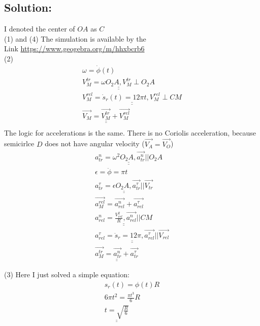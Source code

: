 \documentclass[a4paper,11pt,oneside,article]{memoir}
\def\doubleunderline#1{\underline{\underline{#1}}}
\begin{document}
\subsection{Solution:}
I denoted the center of $OA$ as $C$\\
(1) and (4)  The simulation is available by the\\ Link
\url{https://www.geogebra.org/m/hhxbcrb6}\\
(2) \begin{equation}
\begin{split}
    \omega = \dot \phi(t)\\
    \doubleunderline{
    V_M ^{tr} = \omega O_2A, V_M ^{tr} \perp O_2A
    }\\
    \doubleunderline{
    V_M ^{rel} = \dot s_r(t) = 12\pi t, V_M ^{rel} \perp CM
    }\\
        \doubleunderline{
    \overrightarrow{V_M} = \overrightarrow{V_M ^{tr}} + \overrightarrow{V_M ^{rel}}
    }\\
\end{split}
\end{equation}
The logic for accelerations is the same. There is no Coriolis acceleration, because semicirlce $D$ does not have angular velocity ($\overrightarrow{V_A} = \overrightarrow{V_O}$)\\
\begin{equation}
\begin{split}
    \doubleunderline{
    a_{tr} ^{n} = \omega ^2 O_2A,  \overrightarrow{a_{tr} ^{n}} || O_2A
    }\\
    \epsilon = \ddot \phi = \pi t
    \\
    \doubleunderline{
    a_{tr} ^{\tau} = \epsilon O_2A, \overrightarrow{a_{tr} ^{\tau}} || \overrightarrow{V_{tr}}
    }\\
    \overrightarrow{a_M ^{rel}} =\overrightarrow{a_{rel} ^{n}} + \overrightarrow{a_{rel} ^{\tau}}\\
    \doubleunderline{
    a_{rel} ^{n} = \frac{V_{rel}^2}{R},  \overrightarrow{a_{rel} ^{n}} || CM
    }\\
    \doubleunderline{
    a_{rel} ^{\tau} = \ddot s_r = 12\pi, \overrightarrow{a_{rel} ^{\tau}} || \overrightarrow{V_{rel}}
    }\\
    \doubleunderline{
     \overrightarrow{a_M ^{tr}} =\overrightarrow{a_{tr} ^{n}} + \overrightarrow{a_{tr} ^{\tau}}
    }
\end{split}
\end{equation}

(3) Here I just solved a simple equation:
\begin{equation}
\begin{split}
    s_r (t) = \phi (t) R\\
    6 \pi t^2 = \frac{\pi t^3}{6} R\\
    \doubleunderline{
    t = \sqrt{\frac{R}{6}}
    }
\end{split}
\end{equation}
\end{document}
